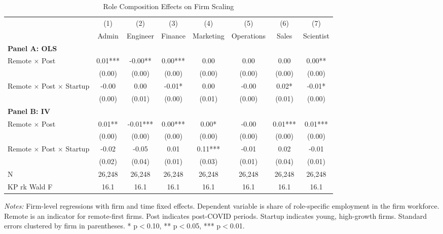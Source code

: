 \documentclass[11pt]{article}
\begin{document}
\begin{table}[H]
\centering
\caption{Role Composition Effects on Firm Scaling}
\begin{threeparttable}
\begin{adjustbox}{width=\textwidth}
\begin{tabular}{lccccccc}
\toprule
 & (1) & (2) & (3) & (4) & (5) & (6) & (7) \\
 & Admin & Engineer & Finance & Marketing & Operations & Sales & Scientist \\
\midrule
\multicolumn{8}{l}{\textbf{Panel A: OLS}} \\
\addlinespace
Remote $\times$ Post & 0.01*** & -0.00** & 0.00*** & 0.00 & 0.00 & 0.00 & 0.00** \\
  & (0.00) & (0.00) & (0.00) & (0.00) & (0.00) & (0.00) & (0.00) \\
\addlinespace[0.5em]
Remote $\times$ Post $\times$ Startup & -0.00 & 0.00 & -0.01* & 0.00 & -0.00 & 0.02* & -0.01* \\
  & (0.00) & (0.01) & (0.00) & (0.01) & (0.00) & (0.01) & (0.00) \\
\midrule
\multicolumn{8}{l}{\textbf{Panel B: IV}} \\
\addlinespace
Remote $\times$ Post & 0.01** & -0.01*** & 0.00*** & 0.00* & -0.00 & 0.01*** & 0.01*** \\
  & (0.00) & (0.00) & (0.00) & (0.00) & (0.00) & (0.00) & (0.00) \\
\addlinespace[0.5em]
Remote $\times$ Post $\times$ Startup & -0.02 & -0.05 & 0.01 & 0.11*** & -0.01 & 0.02 & -0.01 \\
  & (0.02) & (0.04) & (0.01) & (0.03) & (0.01) & (0.04) & (0.01) \\
\midrule
N & 26,248 & 26,248 & 26,248 & 26,248 & 26,248 & 26,248 & 26,248 \\
KP rk Wald F & 16.1 & 16.1 & 16.1 & 16.1 & 16.1 & 16.1 & 16.1 \\
\bottomrule
\end{tabular}
\end{adjustbox}
\begin{tablenotes}
\small
\item \textit{Notes:} Firm-level regressions with firm and time fixed effects. 
Dependent variable is share of role-specific employment in the firm workforce. 
Remote is an indicator for remote-first firms. Post indicates post-COVID periods.
Startup indicates young, high-growth firms.
Standard errors clustered by firm in parentheses. 
* p$<$0.10, ** p$<$0.05, *** p$<$0.01.
\end{tablenotes}
\end{threeparttable}
\end{table}
\end{document}
